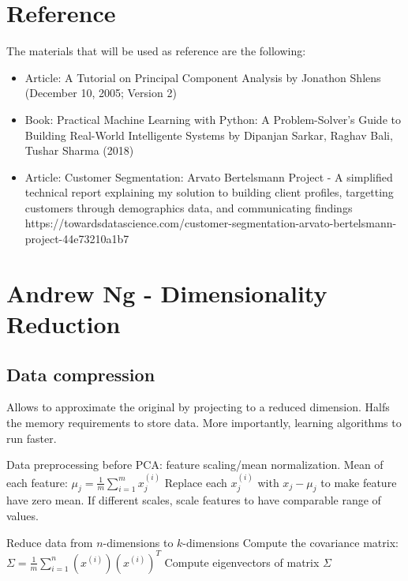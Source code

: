 \hypertarget{reference}{%
\section{Reference}\label{reference}}

The materials that will be used as reference are the following:

\begin{itemize}
\item
  Article: A Tutorial on Principal Component Analysis by Jonathon Shlens
  (December 10, 2005; Version 2)
\item
  Book: Practical Machine Learning with Python: A Problem-Solver's Guide
  to Building Real-World Intelligente Systems by Dipanjan Sarkar, Raghav
  Bali, Tushar Sharma (2018)
\item
  Article: Customer Segmentation: Arvato Bertelsmann Project - A
  simplified technical report explaining my solution to building client
  profiles, targetting customers through demographics data, and
  communicating findings
  https://towardsdatascience.com/customer-segmentation-arvato-bertelsmann-project-44e73210a1b7
\end{itemize}

\hypertarget{andrew-ng---dimensionality-reduction}{%
\section{Andrew Ng - Dimensionality
Reduction}\label{andrew-ng---dimensionality-reduction}}

\hypertarget{data-compression}{%
\subsection{Data compression}\label{data-compression}}

Allows to approximate the original by projecting to a reduced dimension.
Halfs the memory requirements to store data. More importantly, learning
algorithms to run faster.

Data preprocessing before PCA: feature scaling/mean normalization. Mean
of each feature:
\(\mu_j = \frac{1}{m} \displaystyle\sum^{m}_{i=1}x_j^{(i)}\) Replace
each \(x_j^{(i)}\) with \(x_j - \mu_j\) to make feature have zero mean.
If different scales, scale features to have comparable range of values.

Reduce data from \(n\)-dimensions to \(k\)-dimensions Compute the
covariance matrix:
\(\Sigma = \frac{1}{m}\displaystyle\sum_{i=1}^n(x^{(i)})(x^{(i)})^T\)
Compute eigenvectors of matrix \(\Sigma\)

